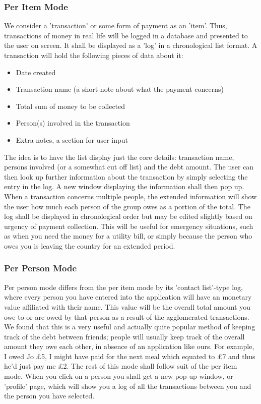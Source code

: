 \documentclass[a4paper,9t]{article}
\begin{document}
\subsubsection*{Per Item Mode}
We consider a 'transaction' or some form of payment as an 'item'. Thus, transactions of money in real life will be logged in a database and presented to the user on screen. It shall be displayed as a 'log' in a chronological list format. 
A transaction will hold the following pieces of data about it:
\begin{itemize}
\item{Date created}
\item{Transaction name (a short note about what the payment concerns)}
\item{Total sum of money to be collected}
\item{Person(s) involved in the transaction}
\item{Extra notes, a section for user input}
\end{itemize}
The idea is to have the list display just the core details: transaction name, persons involved (or a somewhat cut off list) and the debt amount. The user can then look up further information about the transaction by simply selecting the entry in the log. A new window displaying the information shall then pop up. When a transaction concerns multiple people, the extended information will show the user how much each person of the group owes as a portion of the total.
The log shall be displayed in chronological order but may be edited slightly based on urgency of payment collection. This will be useful for emergency situations, such as when you need the money for a utility bill, or simply because the person who owes you is leaving the country for an extended period.

\subsubsection*{Per Person Mode}
Per person mode differs from the per item mode by its 'contact list'-type log, where every person you have entered into the application will have an monetary value affiliated with their name. This value will be the overall total amount you owe to or are owed by that person as a result of the agglomerated transactions. 
We found that this is a very useful and actually quite popular method of keeping track of the debt between friends; people will usually keep track of the overall amount they owe each other, in absence of an application like ours. For example, I owed Jo \pounds5, I might have paid for the next meal which equated to \pounds7 and thus he'd just pay me \pounds2. 
The rest of this mode shall follow suit of the per item mode. When you click on a person you shall get a new pop up window, or 'profile' page, which will show you a log of all the transactions between you and the person you have selected.
\end{document}
